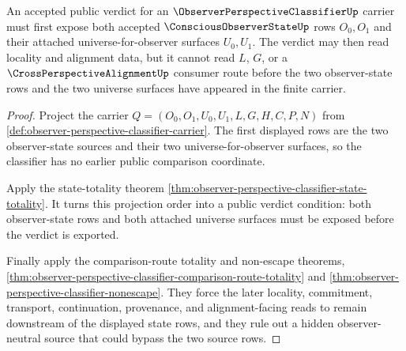 \begin{theorem}
\label{thm:observer-perspective-classifier-two-observer-source-admission}
An accepted public verdict for an $\ObserverPerspectiveClassifierUp$ carrier must first expose both accepted $\ConsciousObserverStateUp$ rows $O_0,O_1$ and their attached universe-for-observer surfaces $U_0,U_1$. The verdict may then read locality and alignment data, but it cannot read $L$, $G$, or a $\CrossPerspectiveAlignmentUp$ consumer route before the two observer-state rows and the two universe surfaces have appeared in the finite carrier.
\end{theorem}
\begin{proof}
Project the carrier $Q=(O_0,O_1,U_0,U_1,L,G,H,C,P,N)$ from \autoref{def:observer-perspective-classifier-carrier}. The first displayed rows are the two observer-state sources and their two universe-for-observer surfaces, so the classifier has no earlier public comparison coordinate.

Apply the state-totality theorem \autoref{thm:observer-perspective-classifier-state-totality}. It turns this projection order into a public verdict condition: both observer-state rows and both attached universe surfaces must be exposed before the verdict is exported.

Finally apply the comparison-route totality and non-escape theorems, \autoref{thm:observer-perspective-classifier-comparison-route-totality} and \autoref{thm:observer-perspective-classifier-nonescape}. They force the later locality, commitment, transport, continuation, provenance, and alignment-facing reads to remain downstream of the displayed state rows, and they rule out a hidden observer-neutral source that could bypass the two source rows.
\end{proof}

